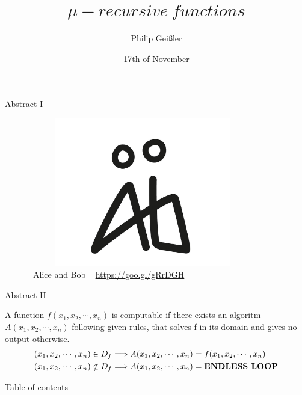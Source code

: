 \documentclass[]{beamer}
\title{\Huge{$\mu-recursive~functions$}} %
\author{Philip Geißler}
\date{17th of November}
\begin{document}
\frame{\titlepage}


\begin{frame}{Abstract I}
	\begin{figure}[htb]
    	\includegraphics[height=6.5cm,width=10cm]{alice_bob.jpg}
		\caption{ ~Alice and Bob ~ \url{https://goo.gl/gRrDGH}}
	\end{figure}
\end{frame}

\begin{frame}{Abstract II}
\begin{center}
A function $f(x_1,x_2,\cdots,x_n)$ is computable if there exists an algoritm $A(x_1,x_2,\cdots,x_n)$ following given rules, that solves f in its domain and gives no output otherwise.\\
\begin{align*}
(x_1,x_2,\cdots,x_n) \in D_f &\Longrightarrow  A(x_1,x_2,\cdots,x_n) = f(x_1,x_2,\cdots,x_n)\\
(x_1,x_2,\cdots,x_n) \notin D_f &\Longrightarrow  A(x_1,x_2,\cdots,x_n) = \text{\textbf{ENDLESS LOOP}}
\end{align*}
\end{center}
\end{frame}

\begin{frame}{Table of contents}
\tableofcontents
\end{frame}
\end{document}
